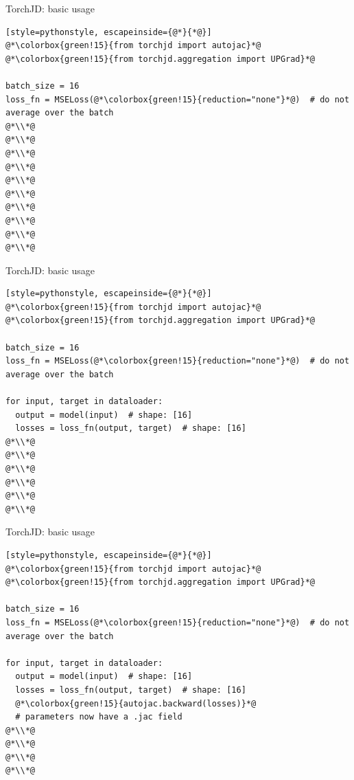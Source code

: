 \documentclass[aspectratio=169]{beamer}
\begin{document}
\begin{frame}[fragile]{TorchJD: basic usage}
\vspace{0.25cm}
\begin{lstlisting}[style=pythonstyle, escapeinside={@*}{*@}]
@*\colorbox{green!15}{from torchjd import autojac}*@
@*\colorbox{green!15}{from torchjd.aggregation import UPGrad}*@

batch_size = 16
loss_fn = MSELoss(@*\colorbox{green!15}{reduction="none"}*@)  # do not average over the batch
@*\\*@
@*\\*@
@*\\*@
@*\\*@
@*\\*@
@*\\*@
@*\\*@
@*\\*@
@*\\*@
@*\\*@
\end{lstlisting}
\end{frame}

\begin{frame}[fragile]{TorchJD: basic usage}
\vspace{0.26cm}
\begin{lstlisting}[style=pythonstyle, escapeinside={@*}{*@}]
@*\colorbox{green!15}{from torchjd import autojac}*@
@*\colorbox{green!15}{from torchjd.aggregation import UPGrad}*@

batch_size = 16
loss_fn = MSELoss(@*\colorbox{green!15}{reduction="none"}*@)  # do not average over the batch

for input, target in dataloader:
  output = model(input)  # shape: [16]
  losses = loss_fn(output, target)  # shape: [16]
@*\\*@
@*\\*@
@*\\*@
@*\\*@
@*\\*@
@*\\*@
\end{lstlisting}
\end{frame}

\begin{frame}[fragile]{TorchJD: basic usage}
\vspace{0.38cm}
\begin{lstlisting}[style=pythonstyle, escapeinside={@*}{*@}]
@*\colorbox{green!15}{from torchjd import autojac}*@
@*\colorbox{green!15}{from torchjd.aggregation import UPGrad}*@

batch_size = 16
loss_fn = MSELoss(@*\colorbox{green!15}{reduction="none"}*@)  # do not average over the batch

for input, target in dataloader:
  output = model(input)  # shape: [16]
  losses = loss_fn(output, target)  # shape: [16]
  @*\colorbox{green!15}{autojac.backward(losses)}*@
  # parameters now have a .jac field
@*\\*@
@*\\*@
@*\\*@
@*\\*@
\end{lstlisting}
\end{frame}
\end{document}
